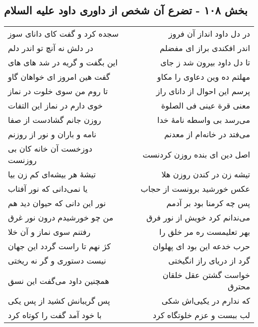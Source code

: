 \begin{center}
\section*{بخش ۱۰۸ - تضرع آن شخص از داوری داود علیه السلام}
\label{sec:sh108}
\begin{longtable}{l p{0.5cm} r}
سجده کرد و گفت کای دانای سوز
&&
در دل داود انداز آن فروز
\\
در دلش نه آنچ تو اندر دلم
&&
اندر افکندی براز ای مفضلم
\\
این بگفت و گریه در شد های های
&&
تا دل داود بیرون شد ز جای
\\
گفت هین امروز ای خواهان گاو
&&
مهلتم ده وین دعاوی را مکاو
\\
تا روم من سوی خلوت در نماز
&&
پرسم این احوال از دانای راز
\\
خوی دارم در نماز این التفات
&&
معنی قرة عینی فی الصلوة
\\
روزن جانم گشادست از صفا
&&
می‌رسد بی واسطه نامهٔ خدا
\\
نامه و باران و نور از روزنم
&&
می‌فتد در خانه‌ام از معدنم
\\
دوزخست آن خانه کان بی روزنست
&&
اصل دین ای بنده روزن کردنست
\\
تیشهٔ هر بیشه‌ای کم زن بیا
&&
تیشه زن در کندن روزن هلا
\\
یا نمی‌دانی که نور آفتاب
&&
عکس خورشید برونست از حجاب
\\
نور این دانی که حیوان دید هم
&&
پس چه کرمنا بود بر آدمم
\\
من چو خورشیدم درون نور غرق
&&
می‌ندانم کرد خویش از نور فرق
\\
رفتنم سوی نماز و آن خلا
&&
بهر تعلیمست ره مر خلق را
\\
کژ نهم تا راست گردد این جهان
&&
حرب خدعه این بود ای پهلوان
\\
نیست دستوری و گر نه ریختی
&&
گرد از دریای راز انگیختی
\\
همچنین داود می‌گفت این نسق
&&
خواست گشتن عقل خلقان محترق
\\
پس گریبانش کشید از پس یکی
&&
که ندارم در یکیی‌اش شکی
\\
با خود آمد گفت را کوتاه کرد
&&
لب ببست و عزم خلوتگاه کرد
\\
\end{longtable}
\end{center}
